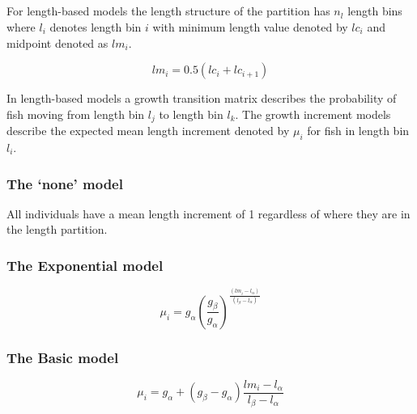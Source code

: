 \subsection{\label{sec:GrowthIncrement}}

For length-based models the length structure of the partition has \(n_l\) length bins where \(l_i\) denotes length bin \(i\) with minimum length value denoted by \(lc_i\) and midpoint denoted as \(lm_i\).

\[
lm_i = 0.5 \left(lc_i + lc_{i+1}\right)
\]

In length-based models a growth transition matrix describes the probability of fish moving from length bin \(l_j\) to length bin \(l_k\). The growth increment models describe the expected mean length increment denoted by \(\mu_i\) for fish in length bin \(l_i\).

\subsubsection{The `none' model}\label{sec:GrowthIncrement-None}

All individuals have a mean length increment of 1 regardless of where they are in the length partition.

\subsubsection{The Exponential model}\label{sec:GrowthIncrement-Exponential}

\begin{equation}
\mu_i = g_\alpha \left(\frac{g_\beta}{g_\alpha} \right)^{\frac{(lm_i - l_\alpha)}{(l_\beta - l_\alpha)}}
\end{equation}

\subsubsection{The Basic model}\label{sec:GrowthIncrement-Basic}

\begin{equation}
\mu_i = g_\alpha + (g_\beta - g_\alpha) \frac{lm_i - l_\alpha}{l_\beta - l_\alpha}
\end{equation}

